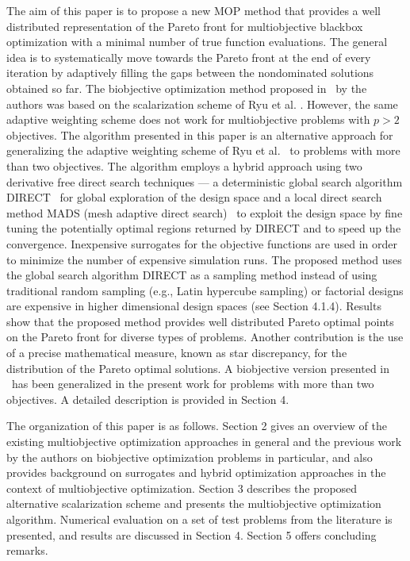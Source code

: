 The aim of this paper is to propose a new MOP method that provides a well 
distributed representation of the Pareto front for multiobjective blackbox 
optimization with a minimal number of true function evaluations. 
The general idea is to systematically move towards the Pareto front at the end
of every iteration by adaptively filling the gaps between the nondominated
solutions obtained so far. The biobjective optimization method proposed in
\DWC\ by the authors was based on the scalarization scheme of Ryu
et al. \RKW. However, the same adaptive weighting scheme does not work for
multiobjective problems with $p > 2$ objectives. The algorithm presented in
this paper is an alternative approach for generalizing the adaptive
weighting scheme of Ryu et al. \RKW\ to problems with more than two objectives.
The algorithm employs a hybrid approach using two derivative free direct search
techniques --- a deterministic global search algorithm DIRECT \JPS\ for global
exploration of the design space and a local direct search method MADS (mesh
adaptive direct search) \AD\ to exploit the design space by fine tuning the
potentially optimal regions returned by DIRECT and to speed up the convergence.
Inexpensive surrogates for the objective functions are used in order to
minimize the number of expensive simulation runs. The proposed method uses the
global search algorithm DIRECT as a sampling method instead of using
traditional random sampling (e.g., Latin hypercube sampling) or factorial
designs are expensive in higher dimensional  design spaces (see Section 4.1.4).
Results show that the proposed method provides well distributed Pareto optimal
points on the Pareto front for diverse types of problems.  Another contribution
is the use of a precise mathematical measure, known as star discrepancy, for
the distribution of the Pareto optimal solutions. A biobjective version
presented in \DWC\ has been generalized in the present work for problems with
more than two objectives. A detailed description is provided in Section 4.  

The organization of this paper is as follows. Section 2 gives an overview  
of the existing multiobjective optimization approaches in general and the 
previous work by the authors on biobjective optimization problems in particular, 
and also provides background on surrogates and hybrid optimization approaches 
in the context of multiobjective optimization. Section 3 describes the proposed  
alternative scalarization scheme and presents the multiobjective optimization 
algorithm. Numerical evaluation on a set of test problems from the literature 
is presented, and results are discussed in Section 4. Section 5 offers 
concluding remarks.
 
